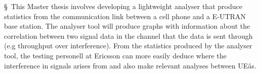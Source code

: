\documentclass [cropmarks, frame, english, master]{idaexhibitpage}
\author {Paul Nedstrand \& Razmus Lindgren}
\begin{document}
\exhibitpagebeforeabstract 
 \S  \ This Master thesis involves developing a lightweight analyser that produce statistics from the communication link between a cell phone and a E-UTRAN base station. The analyser tool will produce graphs with information about the correlation between two signal data in the channel that the data is sent through (e.g throughput over interference). From the statistics produced by the analyser tool, the testing personell at Ericsson can more easily deduce where the interference in signals arises from and also make relevant analyses between UE\^as. 
\exhibitpageafterabstract 
\end{document}
